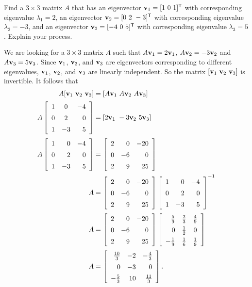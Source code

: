 \begin{example} Find a $3 \times 3$ matrix $A$ that has an eigenvector $\vv_1 = [1 \ 0 \ 1]^{\tr}$ with corresponding eigenvalue $\lambda_1 = 2$, an eigenvector $\vv_2 = [0 \ 2 \ -3]^{\tr}$ with corresponding eigenvalue $\lambda_2 = -3$, and an eigenvector $\vv_3 = [-4 \ 0 \ 5]^{\tr}$ with corresponding eigenvalue $\lambda_3 = 5$. Explain your process. 

\ExampleSolution
We are looking for a $3 \times 3$ matrix $A$ such that $A \mathbf{v}_1 = 2 \mathbf{v}_1$, $A \mathbf{v}_2 = -3 \mathbf{v}_2$ and $A \mathbf{v}_3 = 5 \mathbf{v}_3$. Since $\mathbf{v}_1$, $\mathbf{v}_2$, and $\mathbf{v}_3$ are eigenvectors corresponding to different eigenvalues, $\mathbf{v}_1$, $\mathbf{v}_2$, and $\mathbf{v}_3$ are linearly independent. So the matrix $[\mathbf{v}_1 \ \mathbf{v}_2 \ \mathbf{v}_3]$ is invertible. It follows that 
\begin{align*}
A[\vv_1 \ \vv_2 \ \vv_3] &= [A\vv_1 \ A\vv_2 \ A\vv_3] \\
A \left[\begin{array}{rcr} 1&0&-4 \\ 0&2&0 \\ 1&-3&5 \end{array} \right] &= [2\vv_1 \ -3\vv_2 \ 5\vv_3] \\
A \left[\begin{array}{crr} 1&0&-4 \\ 0&2&0 \\ 1&-3&5 \end{array} \right] &= \left[ \begin{array}{crr} 2&0&-20 \\ 0&-6&0 \\ 2&9&25 \end{array} \right] \\
A &=  \left[ \begin{array}{crr} 2&0&-20 \\ 0&-6&0 \\ 2&9&25 \end{array} \right] \left[\begin{array}{crr} 1&0&-4 \\ 0&2&0 \\ 1&-3&5 \end{array} \right]^{-1}\\
A &= \left[ \begin{array}{crr} 2&0&-20 \\ 0&-6&0 \\ 2&9&25 \end{array} \right]  \left[\renewcommand{\arraystretch}{1.4} \begin{array}{rcc} \frac{5}{9}&\frac{2}{3}&\frac{4}{9} \\ 0&\frac{1}{2}&0 \\ -\frac{1}{9}&\frac{1}{6}&\frac{1}{9} \end{array} \right]\\
A &= \left[\renewcommand{\arraystretch}{1.4} \begin{array}{rrr} \frac{10}{3}&-2&-\frac{4}{3} \\ 0&-3&0 \\ -\frac{5}{3}&10&\frac{11}{3} \end{array} \right].
\end{align*}




\end{example}
